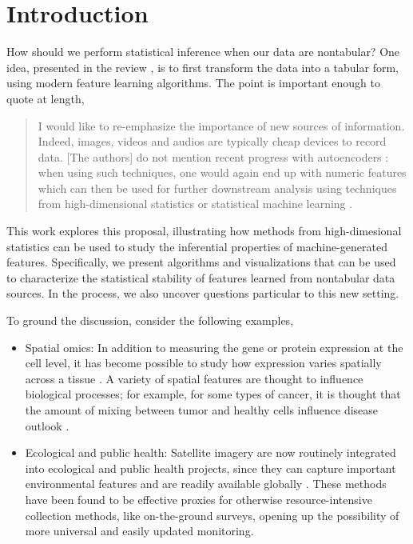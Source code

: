 \section{Introduction}

How should we perform statistical inference when our data are nontabular? One
idea, presented in the review \citep{buhlmann2019comments}, is to first
transform the data into a tabular form, using modern feature learning
algorithms. The point is important enough to quote at length,

\begin{quote}
I would like to re-emphasize the importance of new sources of information.
Indeed, images, videos and audios are typically cheap devices to record data.
[The authors] do not mention recent progress with autoencoders
\citep{hinton2006reducing, vincent2010stacked}: when using such techniques, one
would again end up with numeric features which can then be used for further
downstream analysis using techniques from high-dimensional statistics or
statistical machine learning \citep{hastie2015statistical,
  buhlmann2011statistics}.
\end{quote}

This work explores this proposal, illustrating how methods from high-dimesional
statistics can be used to study the inferential properties of machine-generated
features. Specifically, we present algorithms and visualizations that can be
used to characterize the statistical stability of features learned from
nontabular data sources. In the process, we also uncover questions particular to
this new setting.

To ground the discussion, consider the following examples,

\begin{itemize}
\item Spatial omics: In addition to measuring the gene or protein expression at
  the cell level, it has become possible to study how expression varies
  spatially across a tissue \citep{lundberg2019spatial}. A variety of spatial
  features are thought to influence biological processes; for example, for some
  types of cancer, it is thought that the amount of mixing between tumor and
  healthy cells influence disease outlook \citep{keren2018structured}.
\item Ecological and public health: Satellite imagery are now routinely
  integrated into ecological and public health projects, since they can capture
  important environmental features and are readily available globally
  \citep{jean2016combining, bondimapping}. These methods have been found to be effective
  proxies for otherwise resource-intensive collection methods, like
  on-the-ground surveys, opening up the possibility of more universal and easily
  updated monitoring.
\end{itemize}

